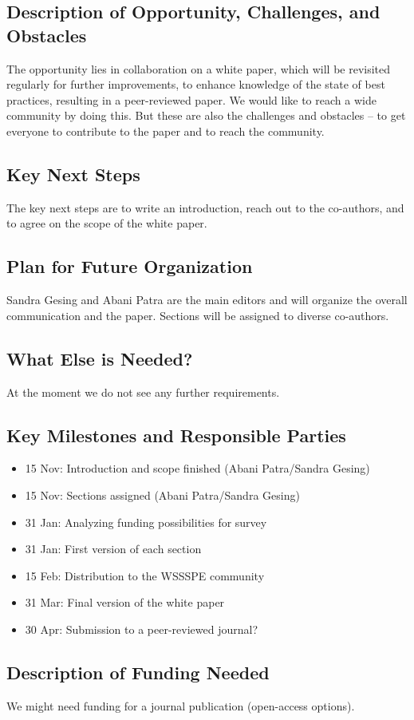 \subsection{Description of Opportunity, Challenges, and Obstacles}

The opportunity lies in collaboration on a white paper, which will be revisited
regularly for further improvements, to enhance knowledge of the state of best
practices, resulting in a peer-reviewed paper. We would like to reach a wide
community by doing this. But these are also the challenges and obstacles -- to
get everyone to contribute to the paper and to reach the community.

\subsection{Key Next Steps}

The key next steps are to write an introduction, reach out to the co-authors,
and to agree on the scope of the white paper.

\subsection{Plan for Future Organization}

Sandra Gesing and Abani Patra are the main editors and will organize the overall
communication and the paper. Sections will be assigned to diverse co-authors.

\subsection{What Else is Needed?}

At the moment we do not see any further requirements.

\subsection{Key Milestones and Responsible Parties}
\begin{itemize}
\item 15 Nov: Introduction and scope finished (Abani Patra/Sandra Gesing)
\item 15 Nov: Sections assigned (Abani Patra/Sandra Gesing)
\item 31 Jan: Analyzing funding possibilities for survey
\item 31 Jan: First version of each section
\item 15 Feb: Distribution to the WSSSPE community
\item 31 Mar: Final version of the white paper
\item 30 Apr: Submission to a peer-reviewed journal?
\end{itemize}

\subsection{Description of Funding Needed}
We might need funding for a journal publication (open-access options).
